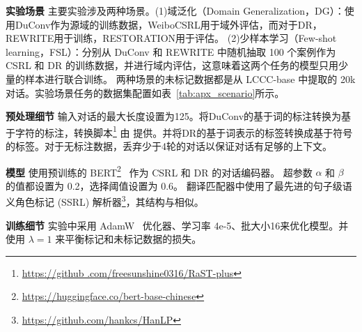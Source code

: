\noindent\textbf{实验场景 }
主要实验涉及两种场景。(1)域泛化（Domain Generalization，DG）：使用DuConv作为源域的训练数据，WeiboCSRL用于域外评估，而对于DR，REWRITE用于训练，RESTORATION用于评估。
(2)少样本学习（Few-shot learning，FSL）：分别从 DuConv 和 REWRITE 中随机抽取 100 个案例作为 CSRL 和 DR 的训练数据，并进行域内评估，这意味着这两个任务的模型只用少量的样本进行联合训练。 两种场景的未标记数据都是从 LCCC-base 中提取的 20k 对话。实验场景任务的数据集配置如表~\ref{tab:apx_scenario}所示。

\noindent\textbf{预处理细节 } 输入对话的最大长度设置为125。将DuConv的基于词的标注转换为基于字符的标注，转换脚本\footnote{\url{https://github .com/freesunshine0316/RaST-plus}} 由 \citet{hao2021rast} 提供。并将DR的基于词表示的标签转换成基于符号的标签。对于无标注数据，丢弃少于4轮的对话以保证对话有足够的上下文。

\noindent\textbf{模型 } 使用预训练的 BERT\footnote{\url{https://huggingface.co/bert-base-chinese}}~\cite{devlin2018bert} 作为 CSRL 和 DR 的对话编码器。 超参数 $\alpha$ 和 $\beta$ 的值都设置为 0.2，选择阈值设置为 0.6。 翻译匹配器中使用了最先进的句子级语义角色标记 (SSRL) 解析器\footnote{\url{https://github.com/hankcs/HanLP}}，其结构与\cite{he-choi-2021-stem}相似。

\noindent\textbf{训练细节 } 实验中采用 AdamW~\cite{loshchilov2017decoupled} 优化器、学习率 4e-5、批大小16来优化模型。并使用 $\lambda=1$ 来平衡标记和未标记数据的损失。

\begin{table}[ht]
    \centering
    \caption{域泛化和少样本学习的数据集配置。}
    \label{tab:apx_scenario}
\end{table}

